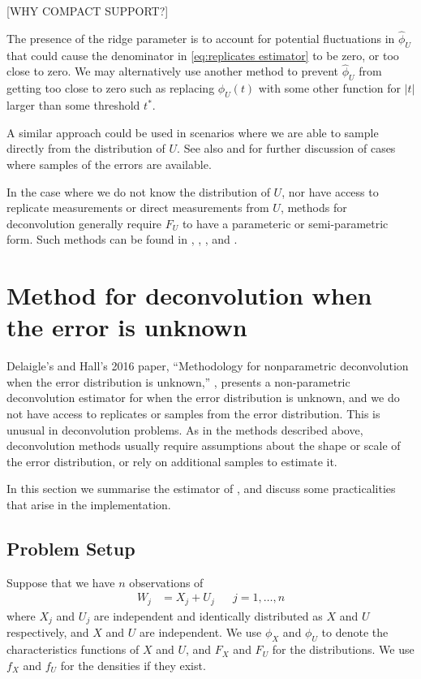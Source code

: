 	[WHY COMPACT SUPPORT?]

	The presence of the ridge parameter is to account for potential fluctuations in $\hat{\phi}_U$ that could cause the denominator in \eqref{eq:replicates estimator} to be zero, or too close to zero. We may alternatively use another method to prevent $\hat{\phi}_U$ from getting too close to zero such as replacing $\hat{\phi}_U(t)$ with some other function for $|t|$ larger than some threshold $t^*$.

	A similar approach could be used in scenarios where we are able to sample directly from the distribution of $U$. See also \cite{Diggle1993-jy} and \cite{Neumann1997-cr} for further discussion of cases where samples of the errors are available.

	In the case where we do not know the distribution of $U$, nor have access to replicate measurements or direct measurements from $U$, methods for deconvolution generally require $F_U$ to have a parameteric or semi-parametric form. Such methods can be found in \cite{Butucea2005-be}, \cite{Meister2006-nu}, \cite{Butucea2008-wm}, and \cite{Kneip2012-aa}.
 
\section{Method for deconvolution when the error is unknown}
\label{sec:summary of delaigle hall}
	Delaigle's and Hall's 2016 paper, ``Methodology for nonparametric deconvolution when the error distribution is unknown,'' \cite{Delaigle2016-la}, presents a non-parametric deconvolution estimator for when the error distribution is unknown, and we do not have access to replicates or samples from the error distribution. This is unusual in deconvolution problems. As in the methods described above, deconvolution methods usually require assumptions about the shape or scale of the error distribution, or rely on additional samples to estimate it. 

	In this section we summarise the estimator of \cite{Delaigle2016-la}, and discuss some practicalities that arise in the implementation. 

	\subsection{Problem Setup}
	Suppose that we have $n$ observations of
	\begin{align}
		W_j &= X_j + U_j &&j = 1, \dots, n
	\end{align}
	where $X_j$ and $U_j$ are independent and identically distributed as $X$ and $U$ respectively, and $X$ and $U$ are independent. We use $\phi_X$ and $\phi_U$ to denote the characteristics functions of $X$ and $U$, and $F_X$ and $F_U$ for the distributions. We use $f_X$ and $f_U$ for the densities if they exist.

